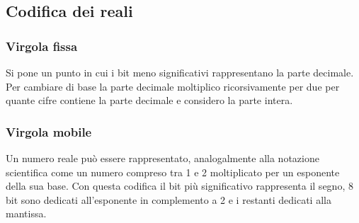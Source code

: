 \subsection{Codifica dei reali}
\subsubsection{Virgola fissa}
Si pone un punto in cui i bit meno significativi rappresentano la parte decimale. Per cambiare di base la parte decimale moltiplico ricorsivamente per due per quante cifre 
contiene la parte decimale e considero la parte intera. 
\subsubsection{Virgola mobile}
Un numero reale pu\`o essere rappresentato, analogalmente alla notazione scientifica come un numero compreso tra 1 e 2 moltiplicato per un esponente della sua base. Con questa
codifica il bit pi\`u significativo rappresenta il segno, 8 bit sono dedicati all'esponente in complemento a 2 e i restanti dedicati alla mantissa. 